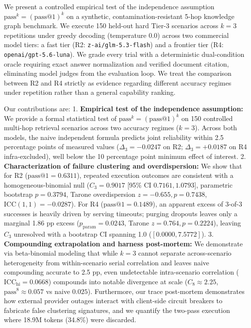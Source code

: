 \documentclass[11pt,letterpaper]{article}
\begin{document}
We present a controlled empirical test of the independence assumption $\text{pass}^k = (\text{pass@1})^k$ on a synthetic, contamination-resistant 5-hop knowledge graph benchmark. We execute 150 held-out hard Tier-3 scenarios across $k=3$ repetitions under greedy decoding (temperature 0.0) across two commercial model tiers: a fast tier (R2: \texttt{z-ai/glm-5.3-flash}) and a frontier tier (R4: \texttt{openai/gpt-5.6-luna}). We grade every trial with a deterministic dual-condition oracle requiring exact answer normalization and verified document citation, eliminating model judges from the evaluation loop. We treat the comparison between R2 and R4 strictly as evidence regarding different accuracy regimes under repetition rather than a general capability ranking.

Our contributions are:
1. \textbf{Empirical test of the independence assumption:} We provide a formal statistical test of $\text{pass}^k = (\text{pass@1})^k$ on 150 controlled multi-hop retrieval scenarios across two accuracy regimes ($k=3$). Across both models, the naive independent formula predicts joint reliability within 2.5 percentage points of measured values ($\Delta_3 = -0.0247$ on R2; $\Delta_3 = +0.0187$ on R4 infra-excluded), well below the 10 percentage point minimum effect of interest.
2. \textbf{Characterization of failure clustering and overdispersion:} We show that for R2 ($\text{pass@1} = 0.6311$), repeated execution outcomes are consistent with a homogeneous-binomial null ($C_3 = 0.9017$ [95\% CI $0.7161, 1.0793$], parametric bootstrap $p = 0.3794$, Tarone overdispersion $z = -0.655, p = 0.7438$, $\text{ICC}(1,1) = -0.0287$). For R4 ($\text{pass@1} = 0.1489$), an apparent excess of 3-of-3 successes is heavily driven by serving timeouts; purging dropouts leaves only a marginal 1.86 pp excess ($p_{\text{param}} = 0.0243$, Tarone $z = 0.764, p = 0.2224$), leaving $C_3$ unresolved with a bootstrap CI spanning 1.0 ($[0.0000, 7.5772]$).
3. \textbf{Compounding extrapolation and harness post-mortem:} We demonstrate via beta-binomial modeling that while $k=3$ cannot separate across-scenario heterogeneity from within-scenario serial correlation and leaves naive compounding accurate to 2.5 pp, even undetectable intra-scenario correlation ($\text{ICC}_{\text{hi}} = 0.0668$) compounds into notable divergence at scale ($C_8 \approx 2.25$, $\text{pass}^8 \approx 0.057$ vs naive $0.025$). Furthermore, our trace post-mortem demonstrates how external provider outages interact with client-side circuit breakers to fabricate false clustering signatures, and we quantify the two-pass execution where 18.9M tokens (34.8\%) were discarded.
\end{document}
